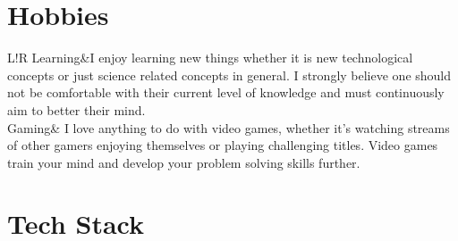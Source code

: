 \documentclass[12pt]{article}
\newcommand\VRule{\color{lightgray}\vrule width 0.5pt}
\begin{document}
\section*{Hobbies}
\begin{tabular}{L!{\VRule}R}
	Learning&I enjoy learning new things whether it is new technological concepts
	or just science related concepts in general. I strongly believe one should not
	be comfortable with their current level of knowledge and must continuously aim
	to better their mind.\\
	Gaming& I love anything to do with video games, whether it's watching streams of
	other gamers enjoying themselves or playing challenging titles. Video
	games train your mind and develop your problem solving skills further. 
\end{tabular}

\newpage

\section*{Tech Stack}
\end{document}
